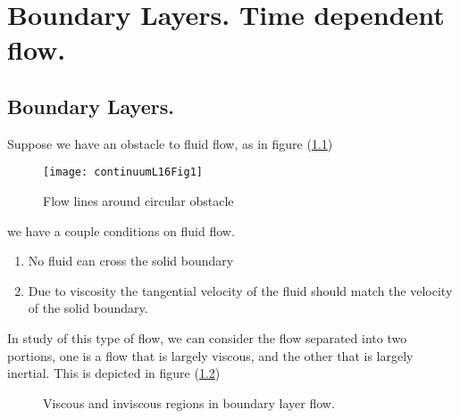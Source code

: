 %
%

\chapter{Boundary Layers.  Time dependent flow.}
\label{chap:continuumL16}
{}
\date{Mar 14, 2012}

\beginArtWithToc

%
%
\section{Boundary Layers.}

Suppose we have an obstacle to fluid flow, as in figure (\ref{fig:continuumL16:continuumL16Fig1})
\begin{figure}[htp]
   \centering
   \texttt{[image: continuumL16Fig1]}
   \caption{Flow lines around circular obstacle}\label{fig:continuumL16:continuumL16Fig1}
\end{figure}

we have a couple conditions on fluid flow.

\begin{enumerate}
\item No fluid can cross the solid boundary
\item Due to viscosity the tangential velocity of the fluid should match the velocity of the solid boundary.
\end{enumerate}

In study of this type of flow, we can consider the flow separated into two portions, one is a flow that is largely viscous, and the other that is largely inertial.  This is depicted in figure (\ref{fig:continuumL16:continuumL16Fig2})
\begin{figure}[htp]
   \centering
   \def\svgwidth{0.5\columnwidth}
   
   \caption{Viscous and inviscous regions in boundary layer flow.}\label{fig:continuumL16:continuumL16Fig2}
\end{figure}

